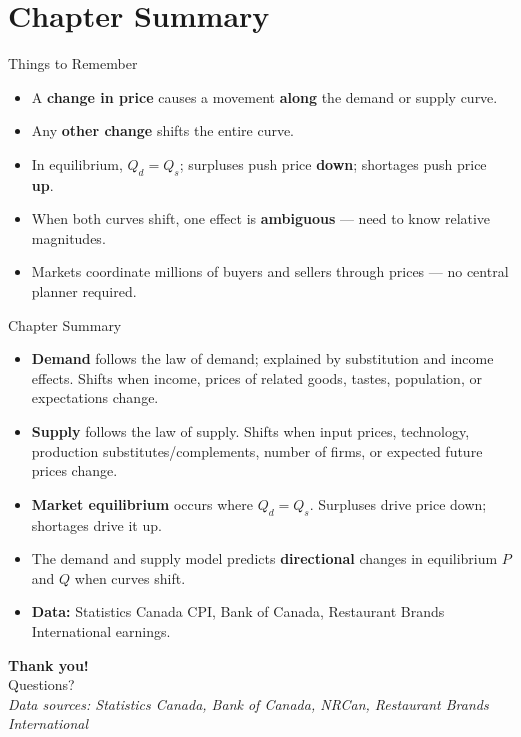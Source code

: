 \documentclass[aspectratio=169]{beamer}
\begin{document}
\section{Chapter Summary}

\begin{frame}{Things to Remember}
\transfade
\begin{itemize}
  \item A \textbf{change in price} causes a movement \textbf{along} the demand or supply curve.
  \item Any \textbf{other change} shifts the entire curve.
  \item In equilibrium, $Q_d = Q_s$; surpluses push price \textbf{down}; shortages push price \textbf{up}.
  \item When both curves shift, one effect is \textbf{ambiguous} --- need to know relative magnitudes.
  \item Markets coordinate millions of buyers and sellers through prices --- no central planner required.
\end{itemize}
\end{frame}

\begin{frame}{Chapter Summary}
\transfade
\begin{itemize}
  \item \textbf{Demand} follows the law of demand; explained by substitution and income effects. Shifts when income, prices of related goods, tastes, population, or expectations change.
  \item \textbf{Supply} follows the law of supply. Shifts when input prices, technology, production substitutes/complements, number of firms, or expected future prices change.
  \item \textbf{Market equilibrium} occurs where $Q_d = Q_s$. Surpluses drive price down; shortages drive it up.
  \item The demand and supply model predicts \textbf{directional} changes in equilibrium $P$ and $Q$ when curves shift.
  \item \textbf{Data:} Statistics Canada CPI, Bank of Canada, Restaurant Brands International earnings.
\end{itemize}
\end{frame}

\begin{frame}
\centering
\Huge \textbf{Thank you!}\\[1em]
\normalsize Questions?\\[0.5em]
\small \textit{Data sources: Statistics Canada, Bank of Canada, NRCan, Restaurant Brands International}
\end{frame}
\end{document}
